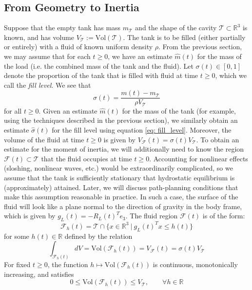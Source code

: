 \documentclass[letterpaper, 10 pt, conference]{ieeeconf}  %
\newcounter{part} %
\newcommand{\R}{\mathbb{R}}
\begin{document}
\subsection*{From Geometry to Inertia}
Suppose that the empty tank has mass $m_\mathcal{T}$ and the shape of the cavity $\mathcal{T} \subset \R^3$ is known, and has volume $V_{\mathcal{T}} := \text{Vol}(\mathcal{T})$. The tank is to be filled (either partially or entirely) with a fluid of known uniform density $\rho$. From the previous section, we may assume that for each $t \ge 0$, we have an estimate $\hat{m}(t)$ for the mass of the load (i.e. the combined mass of the tank and the fluid). Let $\sigma(t) \in [0,1]$ denote the proportion of the tank that is filled with fluid at time $t \ge 0$, which we call the \textit{fill level}. We see that
\begin{equation}\label{eq: fill_level}
    \sigma(t) = \frac{m(t) - m_{\mathcal{T}}}{\rho V_{\mathcal{T}}}
\end{equation}
for all $t \ge 0$. Given an estimate $\hat{m}(t)$ for the mass of the tank (for example, using the techniques described in the previous section), we similarly obtain an estimate $\hat{\sigma}(t)$ for the fill level using equation \eqref{eq: fill_level}. Moreover, the volume of the fluid at time $t \ge 0$ is given by $V_{\mathcal{F}}(t) = \sigma(t)V_{\mathcal{T}}$. To obtain an estimate for the moment of inertia, we will additionally need to know the region $\mathcal{F}(t) \subset \mathcal{T}$ that the fluid occupies at time $t \ge 0$. Accounting for nonlinear effects (sloshing, nonlinear waves, etc.) would be extraordinarily complicated, so we assume that the tank is sufficiently stationary that hydrostatic equilibrium is (approximately) attained. Later, we will discuss path-planning conditions that make this assumption reasonable in practice. In such a case, the surface of the fluid will look like a plane normal to the direction of gravity in the body frame, which is given by $g_L(t) = -R_L(t)^T e_3$. The fluid region $\mathcal{F}(t)$ is of the form:
\begin{equation}\label{eq: fluid_region}
    \mathcal{F}_h(t) = \mathcal{T} \cap \{x \in \R^3 \ \vert \ g_L(t)^T x \le h(t)\}
\end{equation}
for some $h(t) \in \R$ defined by the relation
$$\int_{\mathcal{F}_h(t)}dV =  \text{Vol}(\mathcal{F}_h(t)) = V_{\mathcal{F}}(t) = \sigma(t)V_{\mathcal{T}}$$
For fixed $t \ge 0$, the function $h \mapsto \text{Vol}(\mathcal{F}_h(t))$ is continuous, monotonically increasing, and satisfies
$$0 \le \text{Vol}(\mathcal{F}_h(t)) \le V_{\mathcal{T}}, \qquad \forall h \in \R$$
\end{document}
